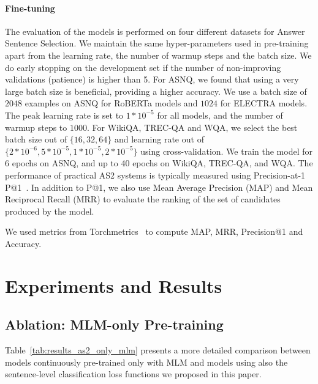 \paragraph{Fine-tuning} The evaluation of the models is performed on four different datasets for Answer Sentence Selection. We maintain the same hyper-parameters used in pre-training apart from the learning rate, the number of warmup steps and the batch size. We do early stopping on the development set if the number of non-improving validations (patience) is higher than 5. For ASNQ, we found that using a very large batch size is beneficial, providing a higher accuracy. We use a batch size of $2048$ examples on ASNQ for RoBERTa models and $1024$ for ELECTRA models. The peak learning rate is set to $1*10^{-5}$ for all models, and the number of warmup steps to $1000$. For WikiQA, TREC-QA and WQA, we select the best batch size out of $\{ 16, 32, 64 \}$ and learning rate out of $\{ 2*10^{-6}, 5*10^{-5}, 1*10^{-5}, 2*10^{-5} \}$ using cross-validation. We train the model for 6 epochs on ASNQ, and up to 40 epochs on WikiQA, TREC-QA, and WQA. The performance of practical AS2 systems is typically measured using Precision-at-1 P@1~\cite{garg-moschitti-2021-will}. In addition to P@1, we also use Mean Average Precision (MAP) and Mean Reciprocal Recall (MRR) to evaluate the ranking of the set of candidates produced by the model.

We used metrics from Torchmetrics~\cite{torchmetrics} to compute MAP, MRR, Precision@1 and Accuracy.


\section{Experiments and Results} 

\subsection{Ablation: MLM-only Pre-training}
Table~\ref{tab:results_as2_only_mlm} presents a more detailed comparison between models continuously pre-trained only with MLM and models using also the sentence-level classification loss functions we proposed in this paper.

